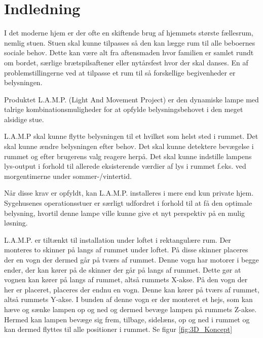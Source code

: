 \chapter{Indledning}

I det moderne hjem er der ofte en skiftende brug af hjemmets største fællesrum, nemlig stuen. Stuen skal kunne tilpasses så den kan lægge rum til alle beboernes sociale behov. Dette kan være alt fra aftensmaden hvor familien er samlet rundt om bordet, særlige brætspilsaftener eller nytårsfest hvor der skal danses. En af problemstillingerne ved at tilpasse et rum til så forskellige begivenheder er belysningen.

Produktet L.A.M.P. (Light And Movement Project) er den dynamiske lampe med talrige kombinationsmuligheder for at opfylde belysningsbehovet i den meget alsidige stue. 

L.A.M.P skal kunne flytte belysningen til et hvilket som helst sted i rummet. Det skal kunne ændre belysningen efter behov. Det skal kunne detektere bevægelse i rummet og efter brugerens valg reagere herpå. Det skal kunne indstille lampens lys-output i forhold til allerede eksisterende værdier af lys i rummet f.eks. ved morgentimerne under sommer-/vintertid.  

Når disse krav er opfyldt, kan L.A.M.P. installeres i mere end kun private hjem. Sygehusenes operationsstuer er særligt udfordret i forhold til at få den optimale belysning, hvortil denne lampe ville kunne give et nyt perspektiv på en mulig løsning. 

L.A.M.P. er tiltænkt til installation under loftet i rektangulære rum. Der monteres to skinner på langs af rummet under loftet. På disse skinner placeres der en vogn der dermed går på tværs af rummet. Denne vogn har motorer i begge ender, der kan kører på de skinner der går på langs af rummet. Dette gør at vognen kan kører på langs af rummet, altså rummets X-akse. På den vogn der her er placeret, placeres der endnu en vogn. Denne kan kører på tværs af rummet, altså rummets Y-akse. I bunden af denne vogn er der monteret et hejs, som kan hæve og sænke lampen op og ned og dermed bevæge lampen på rummets Z-akse. Hermed kan lampen bevæge sig frem, tilbage, sidelæns, op og ned i rummet og kan dermed flyttes til alle positioner i rummet. Se figur \ref{fig:3D_Koncept}

